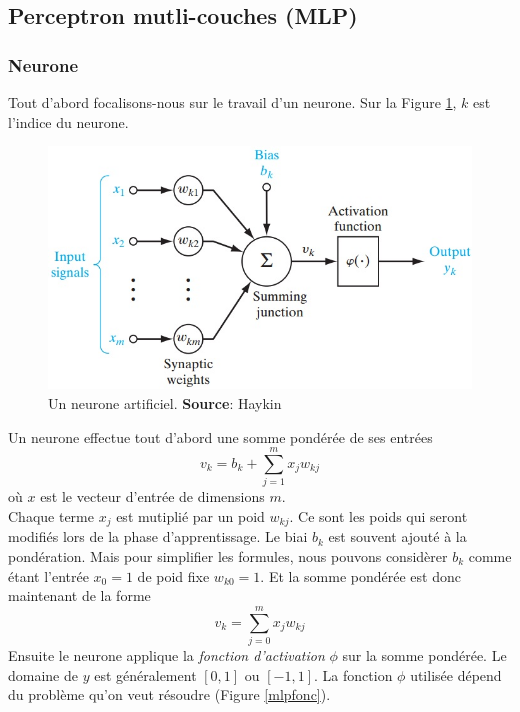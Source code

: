 \subsection{Perceptron mutli-couches (MLP)}
\subsubsection{Neurone}
Tout d'abord focalisons-nous sur le travail d'un neurone.
Sur la Figure \ref{neuronemlp}, $k$ est l'indice du neurone.
\begin{figure}
 \centering
 \includegraphics[scale=0.5]{../figures/neurone.jpg}
 \caption{Un neurone artificiel. \textbf{Source}: Haykin\cite{Haykin}}
 \label{neuronemlp}
\end{figure}
Un neurone effectue tout d'abord une somme pondérée de ses entrées \[v_k = b_k+\sum_{j=1}^{m}x_{j}w_{kj}\] où $x$ est le vecteur d'entrée de dimensions $m$.\\
Chaque terme $x_j$ est mutiplié par un poid $w_{kj}$. Ce sont les poids qui seront modifiés lors de la phase d'apprentissage.
Le biai $b_k$ est souvent ajouté à la pondération. Mais pour simplifier les formules, nous pouvons considèrer $b_k$ comme étant l'entrée $x_0 = 1$ de poid fixe $w_{k0} = 1$.
Et la somme pondérée est donc maintenant de la forme \[v_k = \sum_{j=0}^{m}x_{j}w_{kj}\]
Ensuite le neurone applique la \emph{fonction d'activation} $\phi$ sur la somme pondérée.
Le domaine de $y$ est généralement $[0,1]$ ou $[-1,1]$.\cite{Haykin,statistica}
La fonction $\phi$ utilisée dépend du problème qu'on veut résoudre (Figure \ref{mlpfonc}).
